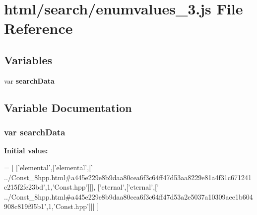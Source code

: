 \section{html/search/enumvalues\-\_\-3.js File Reference}
\label{enumvalues__3_8js}
\subsection*{Variables}
\begin{DoxyCompactItemize}
\item 
var {\bf search\-Data}
\end{DoxyCompactItemize}


\subsection{Variable Documentation}
\subsubsection[{search\-Data}]{\setlength{\rightskip}{0pt plus 5cm}var search\-Data}\label{enumvalues__3_8js_ad01a7523f103d6242ef9b0451861231e}
{\bfseries Initial value\-:}
\begin{DoxyCode}
=
[
  [\textcolor{stringliteral}{'elemental'},[\textcolor{stringliteral}{'elemental'},[\textcolor{stringliteral}{'
      ../Const\_8hpp.html#a445e229e8b9daa80cea6f3c64ff47d53aa8229e81a4f31c671241c215f2fe23bd'},1,\textcolor{stringliteral}{'Const.hpp'}]]],
  [\textcolor{stringliteral}{'eternal'},[\textcolor{stringliteral}{'eternal'},[\textcolor{stringliteral}{'
      ../Const\_8hpp.html#a445e229e8b9daa80cea6f3c64ff47d53a2e5037a10309aee1b604908c819f95b1'},1,\textcolor{stringliteral}{'Const.hpp'}]]]
]
\end{DoxyCode}
